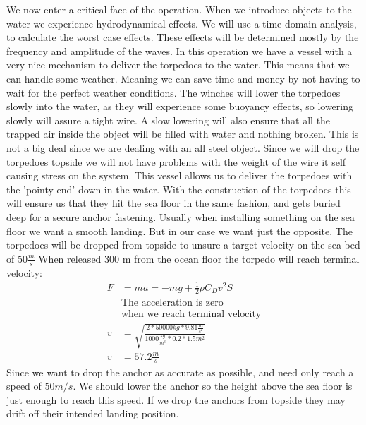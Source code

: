 \documentclass[DIV=calc, paper=a4, fontsize=13pt, twocolumn]{scrartcl}	 %
\begin{document}
We now enter a critical face of the operation. When we introduce objects to the water we experience hydrodynamical effects. We will use a time domain analysis, to calculate the worst case effects. These effects will be determined mostly by the frequency and amplitude of the waves. In this operation we have a vessel with a very nice mechanism to deliver the torpedoes to the water. This means that we can handle some weather. Meaning we can save time and money by not having to wait for the perfect weather conditions.
The winches will lower the torpedoes slowly into the water, as they will experience some buoyancy effects, so lowering slowly will assure a tight wire. A slow lowering will also ensure that all the trapped air inside the object will be filled with water and nothing broken. This is not a big deal since we are dealing with an all steel object. Since we will drop the torpedoes topside we will not have problems with the weight of the wire it self causing stress on the system. 
This vessel allows us to deliver the torpedoes with the 'pointy end' down in the water. With the construction of the torpedoes this will ensure us that they hit the sea floor in the same fashion, and gets buried deep for a secure anchor fastening.
\newline 
Usually when installing something on the sea floor we want a smooth landing. But in our case we want just the opposite. The torpedoes will be dropped from topside to unsure a target velocity on the sea bed of $50 \frac{m}{s}$
When released 300 m from the ocean floor the torpedo will reach terminal velocity:
\begin{align}
F &= ma = -mg + \frac{1}{2} \rho C_D v^2 S \\
&\text{The acceleration is zero} \\
&\text{when we reach terminal velocity} \\
v &= \sqrt{\frac{2 * 50 000 kg * 9.81 \frac{m}{s^2}}{1000\frac{kg}{m^3} * 0.2 * 1.5 m^2}} \\
v &= 57.2 \frac{m}{s}
\end{align}
Since we want to drop the anchor as accurate as possible, and need only reach a speed of $50 m/s$. We should lower the anchor so the height above the sea floor is just enough to reach this speed. If we drop the anchors from topside they may drift off their intended landing position. 
\newline
\end{document}

